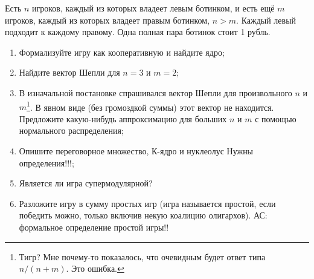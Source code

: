 \begin{problem}[Ботинки-2.]

Есть $n$ игроков, каждый из которых владеет левым ботинком, и есть ещё $m$ игроков, каждый из которых владеет правым ботинком, $n>m$. Каждый левый подходит к каждому правому. Одна полная пара ботинок стоит 1 рубль.

\begin{enumerate}
\item Формализуйте игру как кооперативную и найдите ядро;

\item Найдите вектор Шепли для $n=3$ и $m=2$;

\item В изначальной постановке спрашивался вектор Шепли для произвольного $n$ и $m$\footnote{{\red Тигр?} Мне почему-то показалось, что очевидным будет ответ типа $n/(n+m)$. Это ошибка.}. В явном виде (без громоздкой суммы) этот вектор не находится. Предложите какую-нибудь аппроксимацию для больших $n$ и $m$ с помощью нормального распределения;

\item Опишите переговорное множество, К-ядро и нуклеолус {\red Нужны определения!!!};

\item Является ли игра супермодулярной?

\item Разложите игру в сумму простых игр (игра называется простой, если победить можно, только включив некую коалицию олигархов). {\red АС: формальное определение простой игры!!}
\end{enumerate}



\begin{sol}

\end{sol}
\end{problem}



